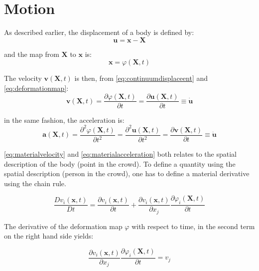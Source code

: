 \section{Motion}
\label{subsec:motion}
As described earlier, the displacement of a body is defined by: 
\begin{equation}
    \mathbf{u = x - X}
    \label{eq:continuumdisplaceent}
\end{equation}

and the map from $\mathbf{X}$ to $\mathbf{x}$ is:
\begin{equation}
    \mathbf{x} = \varphi(\mathbf{X},t)
    \label{eq:deformationmap}
\end{equation}

The velocity $\mathbf{v}(\mathbf{X}, t)$ is then, from \cref{eq:continuumdisplaceent} and \cref{eq:deformationmap}:
\begin{equation}
    \label{eq:materialvelocity}
    \mathbf{v}(\mathbf{X}, t)=\dfrac{\partial \varphi (\mathbf{X}, t)}{\partial t}=\dfrac{\partial \mathbf{u}(\mathbf{X}, t)}{\partial t} \equiv \dot{\mathbf{u}}
\end{equation}

in the same fashion, the acceleration is:
\begin{equation}
    \label{eq:materialacceleration}
    \mathbf{a}(\mathbf{X}, t)=\dfrac{\partial^2 \varphi (\mathbf{X}, t)}{\partial t^2}=\dfrac{\partial^2 \mathbf{u}(\mathbf{X}, t)}{\partial t^2}=\dfrac{\partial \mathbf{v}(\mathbf{X}, t)}{\partial t} \equiv \ddot{\mathbf{u}}
\end{equation}

\cref{eq:materialvelocity} and \cref{eq:materialacceleration} both relates to the spatial description of the body (point in the crowd). To define a quantity using the spatial description (person in the crowd), one has to define a material derivative using the chain rule. 

\begin{equation}
    \label{eq:materialderiv-chain1}
    \dfrac{Dv_i(\mathbf{x},t)}{Dt} = 
    \dfrac{\partial v_i (\mathbf{x}, t)}{\partial t}
     + \dfrac{\partial v_i (\mathbf{x}, t)}{\partial x_j}
     \dfrac{\partial \varphi_i (\mathbf{X}, t)}{\partial t}
\end{equation}

The derivative of the deformation map $\varphi$ with respect to time, in the second term on the right hand side yields:

\begin{equation}
    \dfrac{\partial v_i (\mathbf{x}, t)}{\partial x_j}
     \dfrac{\partial \varphi_i (\mathbf{X}, t)}{\partial t} = v_j
\end{equation}

